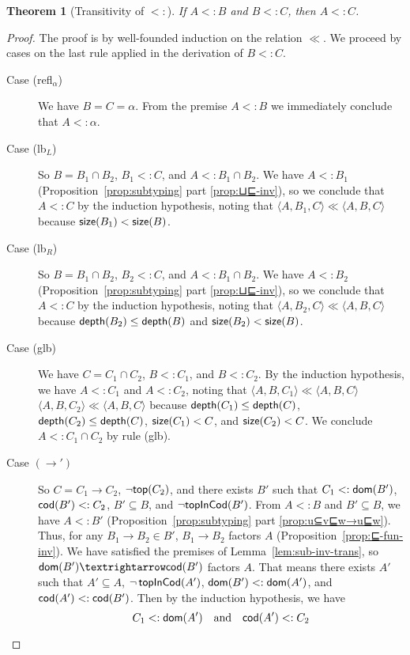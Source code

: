 \documentclass{article}
\newtheorem{theorem}{Theorem}
\begin{document}
\begin{theorem}[Transitivity of $<:$]\label{thm:⊑-trans}
    If $A <: B$ and $B <: C$, then $A <: C$.
\end{theorem}
\begin{proof}
  The proof is by well-founded induction on the relation $\ll$.
  We proceed by cases on the last rule applied in the
  derivation of $B <: C$.
  \begin{description}
  \item[Case (refl$_α$)] We have $B = C = α$.  From the premise $A <:
    B$ we immediately conclude that $A <: α$.
  \item[Case (lb$_L$)] So $B = B_1 ∩ B_2$, $B_1 <: C$, and $A <: B_1 ∩
    B_2$.  We have $A <: B_1$ (Proposition~\ref{prop:subtyping} part
    \ref{prop:⊔⊑-inv}), so we conclude that $A <: C$ by the induction
    hypothesis, noting that $\langle A, B_1, C \rangle \ll \langle A,
    B, C \rangle$ because $\mathsf{size}(B_1) < \mathsf{size}(B)$.
  \item[Case (lb$_R$)] So $B = B_1 ∩ B_2$, $B_2 <: C$, and $A <: B_1 ∩
    B_2$.  We have $A <: B_2$ (Proposition~\ref{prop:subtyping} part
    \ref{prop:⊔⊑-inv}), so we conclude that $A <: C$ by the induction
    hypothesis, noting that $\langle A, B_2, C \rangle \ll \langle A,
    B, C \rangle$ because $\mathsf{depth}(B_2) \leq \mathsf{depth}(B)$ and $\mathsf{size}(B_2)
    < \mathsf{size}(B)$.
  \item[Case (glb)] We have $C = C_1 ∩ C_2$, $B <: C_1$, and $B <:
    C_2$.  By the induction hypothesis, we have $A <: C_1$ and $A <:
    C_2$, noting that $\langle A, B, C_1 \rangle \ll \langle A, B, C
    \rangle$ $\langle A, B, C_2 \rangle \ll \langle A, B, C\rangle$
    because $\mathsf{depth}(C_1) \leq \mathsf{depth}(C)$, $\mathsf{depth}(C_2) \leq
    \mathsf{depth}(C)$, $\mathsf{size}(C_1) < C$, and $\mathsf{size}(C_2) < C$.
    We conclude $A <: C_1 ∩ C_2$ by rule (glb).
  \item[Case $(→')$] So $C = C_1 → C_2$, $\neg \mathsf{top}(C_2)$, and there
    exists $B'$ such that $C_1 <: \mathsf{dom}(B')$, $\mathsf{cod}(B') <: C_2$, $B' ⊆
    B$, and $\neg \mathsf{topInCod}(B')$. From $A <: B$ and $B' ⊆ B$, we have
    $A <: B'$ (Proposition~\ref{prop:subtyping} part
    \ref{prop:u⊆v⊑w→u⊑w}). Thus, for any $B_1 → B_2 ∈ B'$, $B_1 → B_2$
    factors $A$ (Proposition~\ref{prop:⊑-fun-inv}). We have
    satisfied the premises of Lemma~\ref{lem:sub-inv-trans},
    so $\dom{B'} → \cod{B'}$ factors $A$. That means there exists
    $A'$ such that $A' ⊆ A$, $\neg\,\mathsf{topInCod}(A')$, $\mathsf{dom}(B') <: \mathsf{dom}(A')$,
    and $\mathsf{cod}(A') <: \mathsf{cod}(B')$. Then by the induction hypothesis,
    we have
    \[
    C_1 <: \mathsf{dom}(A') \quad\text{and}\quad \mathsf{cod}(A') <: C_2
\]
\end{description}
\end{proof}
\end{document}

